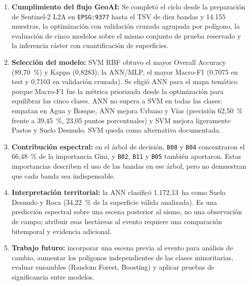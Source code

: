 \documentclass[11pt,a4paper]{article}
\begin{document}
\begin{enumerate}[leftmargin=*,noitemsep,topsep=2pt]
    \item \textbf{Cumplimiento del flujo GeoAI:} Se completó el ciclo desde la preparación de Sentinel-2 L2A en \texttt{EPSG:9377} hasta el TSV de diez bandas y 14.155 muestras, la optimización con validación cruzada agrupada por polígono, la evaluación de cinco modelos sobre el mismo conjunto de prueba reservado y la inferencia ráster con cuantificación de superficies.
    \item \textbf{Selección del modelo:} SVM RBF obtuvo el mayor Overall Accuracy (89,70~\%) y Kappa (0,8283); la ANN/MLP, el mayor Macro-F1 (0,7075 en test y 0,7103 en validación cruzada). Se eligió ANN para el mapa temático porque Macro-F1 fue la métrica priorizada desde la optimización para equilibrar las cinco clases. ANN no supera a SVM en todas las clases: empatan en Agua y Bosque, ANN mejora Urbano y Vías (precisión 62,50~\% frente a 39,45~\%, 23,05 puntos porcentuales) y SVM mejora ligeramente Pastos y Suelo Desnudo. SVM queda como alternativa documentada.
    \item \textbf{Contribución espectral:} en el árbol de decisión, \texttt{B08} y \texttt{B04} concentraron el 66,48~\% de la importancia Gini, y \texttt{B02}, \texttt{B11} y \texttt{B05} también aportaron. Estas importancias describen el uso de las bandas en ese árbol, pero no demuestran que cada banda sea indispensable.
    \item \textbf{Interpretación territorial:} la ANN clasificó 1.172,13~ha como Suelo Desnudo y Roca (34,22~\% de la superficie válida analizada). Es una predicción espectral sobre una escena posterior al sismo, no una observación de campo; atribuir esas hectáreas al evento requiere una comparación bitemporal y evidencia adicional.
    \item \textbf{Trabajo futuro:} incorporar una escena previa al evento para análisis de cambio, aumentar los polígonos independientes de las clases minoritarias, evaluar ensambles (Random Forest, Boosting) y aplicar pruebas de significancia entre modelos.
\end{enumerate}
\end{document}
